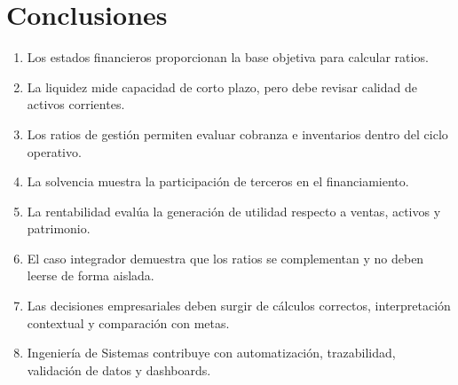 \section{Conclusiones}
\begin{enumerate}
  \item Los estados financieros proporcionan la base objetiva para calcular ratios.
  \item La liquidez mide capacidad de corto plazo, pero debe revisar calidad de activos corrientes.
  \item Los ratios de gestión permiten evaluar cobranza e inventarios dentro del ciclo operativo.
  \item La solvencia muestra la participación de terceros en el financiamiento.
  \item La rentabilidad evalúa la generación de utilidad respecto a ventas, activos y patrimonio.
  \item El caso integrador demuestra que los ratios se complementan y no deben leerse de forma aislada.
  \item Las decisiones empresariales deben surgir de cálculos correctos, interpretación contextual y comparación con metas.
  \item Ingeniería de Sistemas contribuye con automatización, trazabilidad, validación de datos y dashboards.
\end{enumerate}

